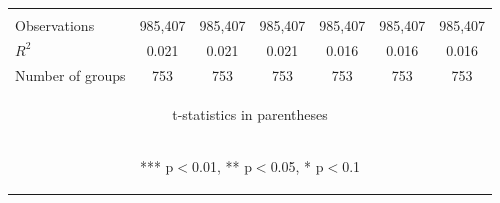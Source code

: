 \documentclass[]{standalone}
\begin{document}
\begin{tabular}{lcccccc}
    \vspace{4pt}     & \begin{footnotesize}\end{footnotesize}         & \begin{footnotesize}\end{footnotesize}         & \begin{footnotesize}\end{footnotesize}         & \begin{footnotesize}\end{footnotesize}         & \begin{footnotesize}\end{footnotesize}         & \begin{footnotesize}\end{footnotesize}         \\
    Observations     & 985,407                                        & 985,407                                        & 985,407                                        & 985,407                                        & 985,407                                        & 985,407                                        \\
    $R^2$            & 0.021                                          & 0.021                                          & 0.021                                          & 0.016                                          & 0.016                                          & 0.016                                          \\
    Number of groups & 753                                            & 753                                            & 753                                            & 753                                            & 753                                            & 753                                            \\ \hline
    \multicolumn{7}{c}{\begin{footnotesize} t-statistics in parentheses\end{footnotesize}}                                                                                                                                                                                                                                 \\
    \multicolumn{7}{c}{\begin{footnotesize} *** p$<$0.01, ** p$<$0.05, * p$<$0.1\end{footnotesize}}                                                                                                                                                                                                                        \\
\end{tabular}
\end{document}
